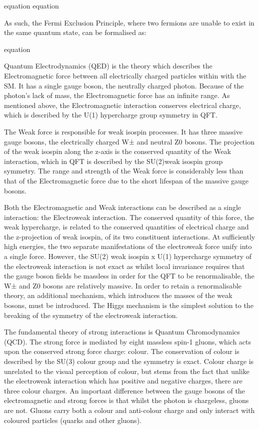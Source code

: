 equation
equation

As such, the Fermi Exclusion Principle, where two fermions are unable to exist in the same quantum state, can be formalised as:

equation

Quantum Electrodynamics (QED) is the theory which describes the Electromagnetic force between all electrically charged particles within with the SM. 
It has a single gauge boson, the neutrally charged photon. 
Because of the photon’s lack of mass, the Electromagnetic force has an infinite range. 
As mentioned above, the Electromagnetic interaction conserves electrical charge, which is described by the U(1) hypercharge group symmetry in QFT. 

The Weak force is responsible for weak isospin processes. 
It has three massive gauge bosons, the electrically charged W± and neutral Z0 bosons. 
The projection of the weak isospin along the z-axis is the conserved quantity of the Weak interaction, which in QFT is described by the SU(2)weak isospin group symmetry. 
The range and strength of the Weak force is considerably less than that of the Electromagnetic force due to the short lifespan of the massive gauge bosons. 

Both the Electromagnetic and Weak interactions can be described as a single interaction: the Electroweak interaction. 
The conserved quantity of this force, the weak hypercharge, is related to the conserved quantities of electrical charge and the z-projection of weak isospin, of its two constituent interactions. 
At sufficiently high energies, the two separate manifestations of the electroweak force unify into a single force. 
However, the SU(2) weak isospin x U(1) hypercharge symmetry of the electroweak interaction is not exact as whilst local invariance requires that the gauge boson fields be massless in order for the QFT to be renormalisable, the W± and Z0 bosons are relatively massive. 
In order to retain a renormalisable theory, an additional mechanism, which introduces the masses of the weak bosons, must be introduced. 
The Higgs mechanism is the simplest solution to the breaking of the symmetry of the electroweak interaction. 

The fundamental theory of strong interactions is Quantum Chromodynamics (QCD). 
The strong force is mediated by eight massless spin-1 gluons, which acts upon the conserved strong force charge: colour. 
The conservation of colour is described by the SU(3) colour group and the symmetry is exact. 
Colour charge is unrelated to the visual perception of colour, but stems from the fact that unlike the electroweak interaction which has positive and negative charges, there are three colour charges. 
An important difference between the gauge bosons of the electromagnetic and strong forces is that whilst the photon is chargeless, gluons are not. 
Gluons carry both a colour and anti-colour charge and only interact with coloured particles (quarks and other gluons). 

